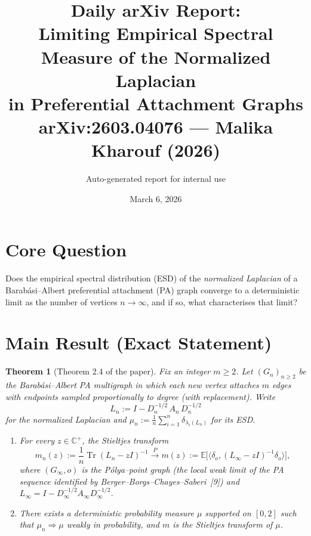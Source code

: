 \documentclass[11pt,a4paper]{article}
\title{Daily arXiv Report:\\
\textbf{Limiting Empirical Spectral Measure of the Normalized Laplacian\\
in Preferential Attachment Graphs}\\[6pt]
\normalsize arXiv:2603.04076 --- Malika Kharouf (2026)}
\author{Auto-generated report for internal use}
\date{March 6, 2026}
\newtheorem{theorem}{Theorem}
\begin{document}
\maketitle

\section{Core Question}

Does the empirical spectral distribution (ESD) of the \emph{normalized Laplacian} of a Barab\'asi--Albert preferential attachment (PA) graph converge to a deterministic limit as the number of vertices $n\to\infty$, and if so, what characterises that limit?

\section{Main Result (Exact Statement)}

\begin{theorem}[Theorem 2.4 of the paper]
Fix an integer $m\ge 2$. Let $(G_n)_{n\ge 2}$ be the Barab\'asi--Albert PA multigraph in which each new vertex attaches $m$ edges with endpoints sampled proportionally to degree (with replacement). Write
\[
  L_n := I - D_n^{-1/2}\,A_n\,D_n^{-1/2}
\]
for the normalized Laplacian and $\mu_n := \frac{1}{n}\sum_{i=1}^{n}\delta_{\lambda_i(L_n)}$ for its ESD.

\begin{enumerate}[label=(\arabic*)]
\item For every $z\in\mathbb{C}^{+}$, the Stieltjes transform
\[
  m_n(z) := \frac{1}{n}\operatorname{Tr}(L_n - zI)^{-1}
  \xrightarrow{\;P\;} m(z) := \mathbb{E}\!\bigl[\langle \delta_o,(L_\infty - zI)^{-1}\delta_o\rangle\bigr],
\]
where $(G_\infty,o)$ is the P\'olya--point graph (the local weak limit of the PA sequence identified by Berger--Borgs--Chayes--Saberi~[9]) and $L_\infty = I - D_\infty^{-1/2}A_\infty D_\infty^{-1/2}$.

\item There exists a deterministic probability measure $\mu$ supported on $[0,2]$ such that $\mu_n \Rightarrow \mu$ weakly in probability, and $m$ is the Stieltjes transform of $\mu$.
\end{enumerate}
\end{theorem}
\end{document}
